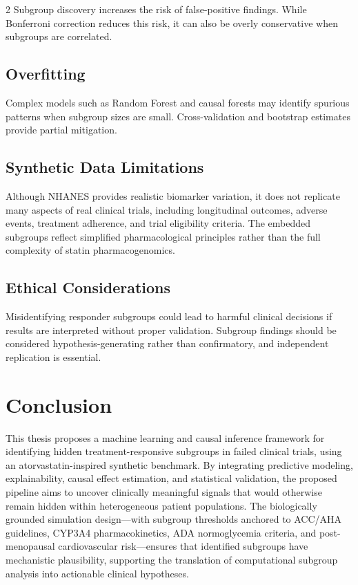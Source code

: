 \documentclass[12pt]{article}
\begin{document}
\begin{multicols}{2}
Subgroup discovery increases the risk of false-positive findings.  While
Bonferroni correction reduces this risk, it can also be overly conservative
when subgroups are correlated.

\subsection{Overfitting}

Complex models such as Random Forest and causal forests may identify
spurious patterns when subgroup sizes are small.  Cross-validation and
bootstrap estimates provide partial mitigation.

\subsection{Synthetic Data Limitations}

Although NHANES provides realistic biomarker variation, it does not replicate
many aspects of real clinical trials, including longitudinal outcomes, adverse
events, treatment adherence, and trial eligibility criteria.  The embedded
subgroups reflect simplified pharmacological principles rather than the full
complexity of statin pharmacogenomics.

\subsection{Ethical Considerations}

Misidentifying responder subgroups could lead to harmful clinical decisions
if results are interpreted without proper validation.  Subgroup findings
should be considered hypothesis-generating rather than confirmatory, and
independent replication is essential.

\section{Conclusion}

This thesis proposes a machine learning and causal inference framework for
identifying hidden treatment-responsive subgroups in failed clinical trials,
using an atorvastatin-inspired synthetic benchmark.  By integrating
predictive modeling, explainability, causal effect estimation, and
statistical validation, the proposed pipeline aims to uncover clinically
meaningful signals that would otherwise remain hidden within heterogeneous
patient populations.  The biologically grounded simulation design---with
subgroup thresholds anchored to ACC/AHA guidelines, CYP3A4 pharmacokinetics,
ADA normoglycemia criteria, and post-menopausal cardiovascular
risk---ensures that identified subgroups have mechanistic plausibility,
supporting the translation of computational subgroup analysis into actionable
clinical hypotheses.

\end{multicols}



\end{document}
